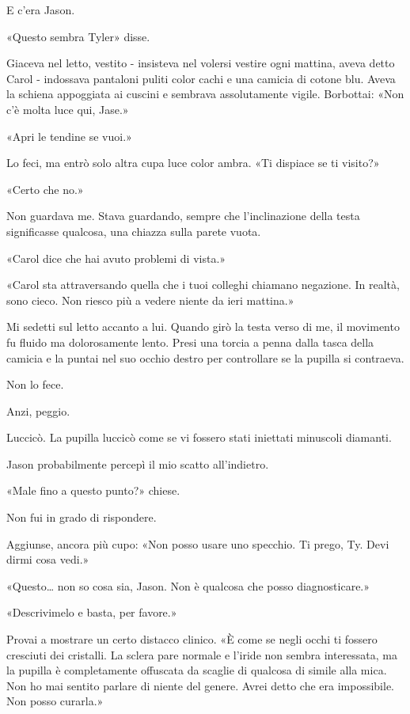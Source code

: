 E c'era Jason.

«Questo sembra Tyler» disse.

Giaceva nel letto, vestito - insisteva nel volersi vestire ogni mattina,
aveva detto Carol - indossava pantaloni puliti color cachi e una camicia
di cotone blu. Aveva la schiena appoggiata ai cuscini e sembrava
assolutamente vigile. Borbottai: «Non c'è molta luce qui, Jase.»

«Apri le tendine se vuoi.»

Lo feci, ma entrò solo altra cupa luce color ambra. «Ti dispiace se ti
visito?»

«Certo che no.»

Non guardava me. Stava guardando, sempre che l'inclinazione della testa
significasse qualcosa, una chiazza sulla parete vuota.

«Carol dice che hai avuto problemi di vista.»

«Carol sta attraversando quella che i tuoi colleghi chiamano negazione.
In realtà, sono cieco. Non riesco più a vedere niente da ieri mattina.»

Mi sedetti sul letto accanto a lui. Quando girò la testa verso di me, il
movimento fu fluido ma dolorosamente lento. Presi una torcia a penna
dalla tasca della camicia e la puntai nel suo occhio destro per
controllare se la pupilla si contraeva.

Non lo fece.

Anzi, peggio.

Luccicò. La pupilla luccicò come se vi fossero stati iniettati minuscoli
diamanti.

Jason probabilmente percepì il mio scatto all'indietro.

«Male fino a questo punto?» chiese.

Non fui in grado di rispondere.

Aggiunse, ancora più cupo: «Non posso usare uno specchio. Ti prego, Ty.
Devi dirmi cosa vedi.»

«Questo\ldots{} non so cosa sia, Jason. Non è qualcosa che posso
diagnosticare.»

«Descrivimelo e basta, per favore.»

Provai a mostrare un certo distacco clinico. «È come se negli occhi ti
fossero cresciuti dei cristalli. La sclera pare normale e l'iride non
sembra interessata, ma la pupilla è completamente offuscata da scaglie
di qualcosa di simile alla mica. Non ho mai sentito parlare di niente
del genere. Avrei detto che era impossibile. Non posso curarla.»

